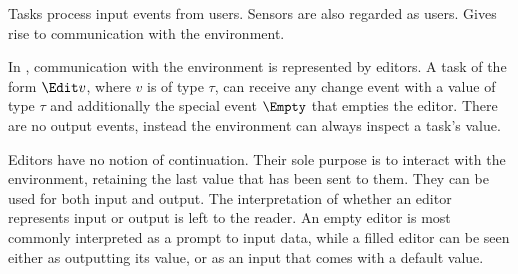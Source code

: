 Tasks process input events from users.
Sensors are also regarded as users.
Gives rise to communication with the environment.

In \TOPHAT, communication with the environment is represented by editors.
A task of the form $\Edit v$, where $v$ is of type $\tau$, can receive any change event with a value of type $\tau$ and additionally the special event $\Empty$ that empties the editor.
There are no output events, instead the environment can always inspect a task's value.

Editors have no notion of continuation.
Their sole purpose is to interact with the environment, retaining the last value that has been sent to them.
%
They can be used for both input and output.
The interpretation of whether an editor represents input or output is left to the reader.
An empty editor is most commonly interpreted as a prompt to input data, while a filled editor can be seen either as outputting its value, or as an input that comes with a default value.


